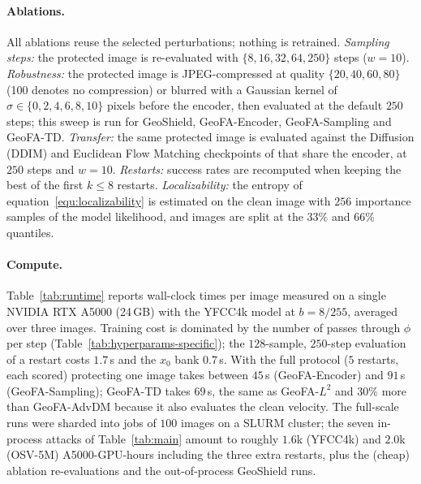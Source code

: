 \paragraph{Ablations.}
All ablations reuse the selected perturbations; nothing is retrained.
\emph{Sampling steps:} the protected image is re-evaluated with
$\{8,16,32,64,250\}$ steps ($w=10$). \emph{Robustness:} the protected image is
JPEG-compressed at quality $\{20,40,60,80\}$ (100 denotes no compression) or blurred with a
Gaussian kernel of $\sigma\in\{0,2,4,6,8,10\}$ pixels before the encoder, then evaluated at
the default $250$ steps; this sweep is run for GeoShield, GeoFA-Encoder, GeoFA-Sampling and
GeoFA-TD. \emph{Transfer:} the same protected image is evaluated against the Diffusion
(DDIM) and Euclidean Flow Matching checkpoints of \citet{dufour2024around} that share the
encoder, at $250$ steps and $w=10$. \emph{Restarts:} success rates are recomputed when
keeping the best of the first $k\le 8$ restarts. \emph{Localizability:} the entropy of
equation~\ref{equ:localizability} is estimated on the clean image with $256$ importance
samples of the model likelihood, and images are split at the $33\%$ and $66\%$ quantiles.

\paragraph{Compute.}
Table~\ref{tab:runtime} reports wall-clock times per image measured on a single NVIDIA RTX
A5000 (24\,GB) with the YFCC4k model at $b=8/255$, averaged over three images. Training cost
is dominated by the number of passes through $\phi$ per step (Table~\ref{tab:hyperparams-specific});
the $128$-sample, $250$-step evaluation of a restart costs $1.7$\,s and the $x_0$ bank
$0.7$\,s. With the full protocol ($5$ restarts, each scored) protecting one image takes
between $45$\,s (GeoFA-Encoder) and $91$\,s (GeoFA-Sampling); GeoFA-TD takes $69$\,s, the same
as GeoFA-$L^2$ and $30\%$ more than GeoFA-AdvDM because it also evaluates the clean velocity.
The full-scale runs were sharded into jobs of $100$ images on a SLURM cluster; the seven
in-process attacks of Table~\ref{tab:main} amount to roughly $1.6$k (YFCC4k) and $2.0$k
(OSV-5M) A5000-GPU-hours including the three extra restarts, plus the (cheap) ablation
re-evaluations and the out-of-process GeoShield runs.

